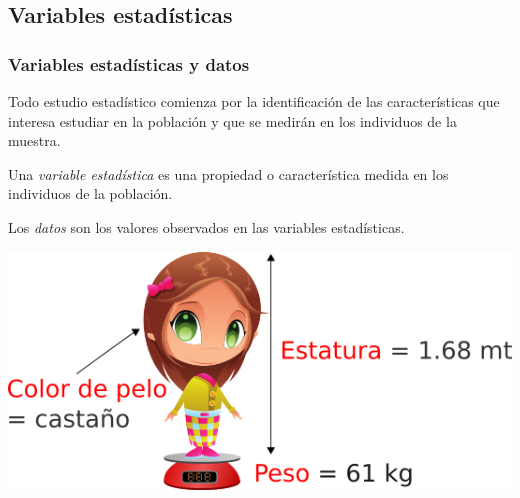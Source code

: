 \subsection{Variables estadísticas}

\begin{frame}
\frametitle{Variables estadísticas y datos}
Todo estudio estadístico comienza por la identificación de las características que interesa estudiar en la población y que se medirán en los individuos de la muestra.
\begin{definition}
Una \emph{variable estadística} es una propiedad o característica medida en los individuos de la población.

Los \emph{datos} son los valores observados en las variables estadísticas.
\end{definition}

\begin{center}
\includegraphics[scale=0.5]{img/introduccion/variables_estadisticas.png}
\end{center}
\end{frame}


